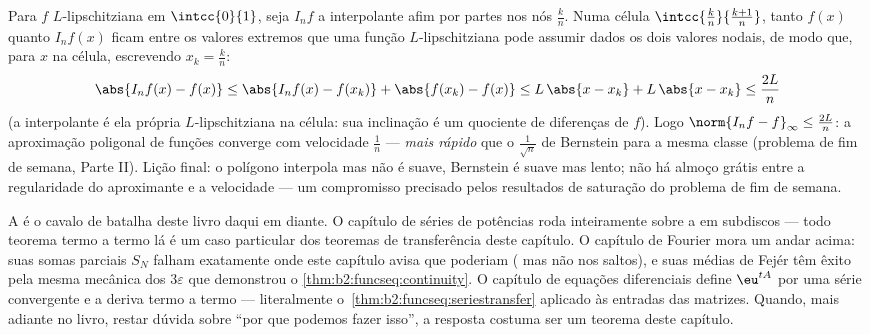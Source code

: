 \begin{example}\label{ex:b2:funcseq:polygonal}
Para $f$ $L$-lipschitziana em $\intcc{0}{1}$, seja $I_nf$ a
interpolante afim por partes nos nós $\frac kn$. Numa
célula $\intcc{\frac kn}{\frac{k+1}n}$, tanto $f(x)$ quanto
$I_nf(x)$ ficam entre os valores extremos que uma função
$L$-lipschitziana pode assumir dados os dois valores nodais, de modo que, para $x$ na
célula, escrevendo $x_k = \frac kn$:
\[
\abs{I_nf(x) - f(x)}
\leq \abs{I_nf(x) - f(x_k)} + \abs{f(x_k) - f(x)}
\leq L\,\abs{x - x_k} + L\,\abs{x - x_k}
\leq \frac{2L}{n}
\]
(a interpolante é ela própria $L$-lipschitziana na célula: sua
inclinação é um quociente de diferenças de $f$). Logo $\norm{I_nf -
f}_\infty \leq \frac{2L}{n}$: a aproximação poligonal de
funções  converge com velocidade $\frac1n$ ---
\emph{mais rápido} que o $\frac{1}{\sqrt n}$ de Bernstein para a
mesma classe (problema de fim de semana, Parte II). Lição final: o
polígono interpola mas não é suave, Bernstein é suave
mas lento; não há almoço grátis entre a regularidade do
aproximante e a velocidade --- um compromisso precisado pelos
resultados de saturação do problema de fim de semana.
\end{example}

\begin{remark}
A  é o cavalo de batalha deste livro daqui em diante. O
capítulo de séries de potências roda inteiramente sobre a  em
subdiscos  --- todo teorema termo a termo lá é um
caso particular dos teoremas de transferência deste capítulo. O capítulo de Fourier
mora um andar acima: suas somas parciais $S_N$ falham
exatamente onde este capítulo avisa que poderiam ( mas não
 nos saltos), e suas médias de Fejér têm êxito pela mesma
mecânica dos $3\varepsilon$ que demonstrou o
\cref{thm:b2:funcseq:continuity}. O capítulo de equações
diferenciais define $\eu^{tA}$ por uma série  convergente e
a deriva termo a termo --- literalmente
o~\cref{thm:b2:funcseq:seriestransfer} aplicado às entradas
das matrizes. Quando, mais adiante no livro, restar dúvida sobre ``por que
podemos fazer isso'', a resposta costuma ser um teorema deste capítulo.
\end{remark}


